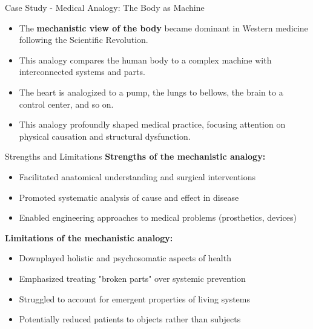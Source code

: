 \documentclass{beamer}
\begin{document}
	\begin{frame}{Case Study - Medical Analogy: The Body as Machine}
		\begin{itemize}
			\item The \textbf{mechanistic view of the body} became dominant in Western medicine following the Scientific Revolution.
			\item This analogy compares the human body to a complex machine with interconnected systems and parts.
			\item The heart is analogized to a pump, the lungs to bellows, the brain to a control center, and so on.
			\item This analogy profoundly shaped medical practice, focusing attention on physical causation and structural dysfunction.
		\end{itemize}
		
		\begin{block}{Strengths and Limitations}
			\scriptsize
			\textbf{Strengths of the mechanistic analogy:}
			\begin{itemize}
				\item Facilitated anatomical understanding and surgical interventions
				\item Promoted systematic analysis of cause and effect in disease
				\item Enabled engineering approaches to medical problems (prosthetics, devices)
			\end{itemize}
			
			\textbf{Limitations of the mechanistic analogy:}
			\begin{itemize}
				\item Downplayed holistic and psychosomatic aspects of health
				\item Emphasized treating "broken parts" over systemic prevention
				\item Struggled to account for emergent properties of living systems
				\item Potentially reduced patients to objects rather than subjects
			\end{itemize}
		\end{block}
	\end{frame}
	
\end{document}
